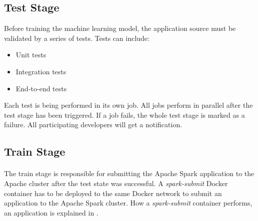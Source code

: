 \subsection{Test Stage}
Before training the machine learning model, the application source must be validated by a series of tests.
Tests can include:
\begin{itemize}
\item Unit tests
\item Integration tests
\item End-to-end tests
\end{itemize}
Each test is being performed in its own job. All jobs perform in parallel after the test stage has been triggered.
If a job fails, the whole test stage is marked as a failure. All participating developers will get a notification.


\subsection{Train Stage}
\paragraph{}
The train stage is responsible for submitting the Apache Spark application to the Apache cluster after the test state was successful.
A \textit{spark-submit} Docker container has to be deployed to the same Docker network to submit an application to the Apache Spark cluster. How a \textit{spark-submit} container performs, an application is explained in .

